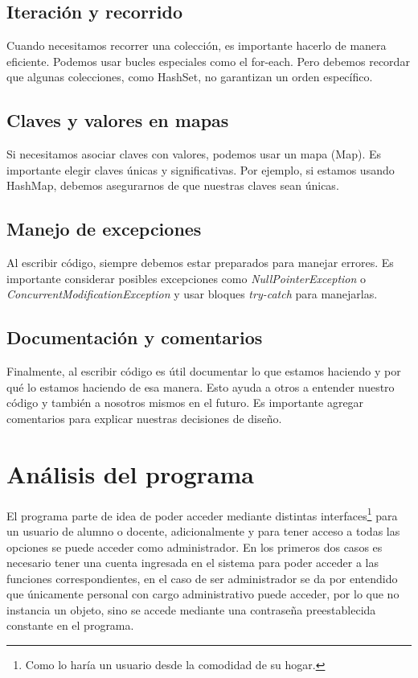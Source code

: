 \documentclass[a4paper,12pt]{article}
\begin{document}
\subsection{Iteración y recorrido}

Cuando necesitamos recorrer una colección, es importante hacerlo de manera eficiente. Podemos usar bucles especiales como el for-each. Pero debemos recordar que algunas colecciones, como HashSet, no garantizan un orden específico.

\subsection{Claves y valores en mapas}

Si necesitamos asociar claves con valores, podemos usar un mapa (Map). Es importante elegir claves únicas y significativas. Por ejemplo, si estamos usando HashMap, debemos asegurarnos de que nuestras claves sean únicas.

\subsection{Manejo de excepciones}

Al escribir código, siempre debemos estar preparados para manejar errores. Es importante considerar posibles excepciones como \textit{NullPointerException} o \textit{ConcurrentModificationException} y usar bloques \textit{try-catch} para manejarlas.

\subsection{Documentación y comentarios}

Finalmente, al escribir código es útil documentar lo que estamos haciendo y por qué lo estamos haciendo de esa manera. Esto ayuda a otros a entender nuestro código y también a nosotros mismos en el futuro. Es importante agregar comentarios para explicar nuestras decisiones de diseño.

\section{Análisis del programa}

El programa parte de idea de poder acceder mediante distintas interfaces\footnote{Como lo haría un usuario desde la comodidad de su hogar.} para un usuario de alumno o docente, adicionalmente y para tener acceso a todas las opciones se puede acceder como administrador. En los primeros dos casos es necesario tener una cuenta ingresada en el sistema para poder acceder a las funciones correspondientes, en el caso de ser administrador se da por entendido que únicamente personal con cargo administrativo puede acceder, por lo que no instancia un objeto, sino se accede mediante una contraseña preestablecida constante en el programa.
\end{document}
